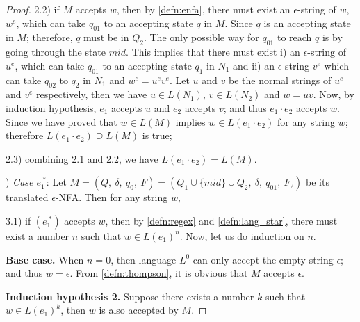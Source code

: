\begin{proof}
\par 2.2) if \(M\) accepts \(w\), then by \autoref{defn:enfa}, there must
exist an \(\epsilon\)-string of \(w\), \(w^e\), which can take
\(q_{01}\) to an accepting state \(q\) in \(M\). Since \(q\) is an
accepting state in \(M\); therefore, \(q\) must be in \(Q_2\). The only possible way for
\(q_{01}\) to reach \(q\) is by going through the state \(mid\). This
implies that there must exist i) an \(\epsilon\)-string of \(u^e\), which can take
\(q_{01}\) to an accepting state \(q_1\) in \(N_1\) and ii) an
\(\epsilon\)-string \(v^e\) which can take \(q_{02}\) to \(q_2\) in
\(N_1\) and \(w^e = u^ev^e\). Let \(u\) and \(v\) be the normal strings of \(u^e\) and
\(v^e\) respectively, then we have \(u \in L(N_1)\), \(v \in L(N_2)\) and \(w = uv\). Now, by induction
hypothesis, \(e_1\) accepts \(u\) and \(e_2\) accepts \(v\); and thus
\(e_1 \cdot e_2\) accepts \(w\). Since we have proved that \(w \in
L(M)\) implies \(w \in L(e_1 \cdot e_2)\) for any string \(w\); therefore \(L(e_1 \cdot
e_2) \supseteq L(M)\) is true; 

\par 2.3) combining 2.1 and 2.2, we have \(L(e_1 \cdot e_2) = L(M)\). 

\par {}) \textit{Case \(e_1^{\ *}\)}: Let \(M = (Q,\ \delta,\ q_0,\
F) = (Q_1 \cup \{mid\} \cup Q_2,\ \delta,\ q_{01},\ F_2)\) be its
translated \(\epsilon\)-NFA. Then for any string \(w\), 

\par 3.1) if \((e_1^{\ *})\) accepts \(w\), then by \autoref{defn:regex}
and \autoref{defn:lang_star}, there must exist a number \(n\) such
that \(w \in L(e_1)^n\). Now, let us do induction on \(n\). 

\par \quad \textbf{Base case.} \quad When \(n = 0\), then language
\(L^0\) can only accept the empty string \(\epsilon\); and thus \(w =
\epsilon\). From \autoref{defn:thompson}, it is obvious that \(M\)
accepts \(\epsilon\). 

\par \quad \textbf{Induction hypothesis 2.} \quad Suppose there exists a number \(k\) such that \(w
\in L(e_1)^k\), then \(w\) is also accepted by \(M\). 


\end{proof}
